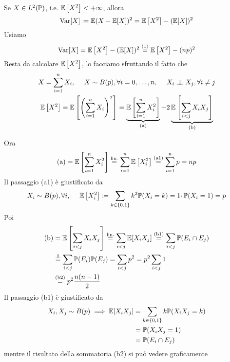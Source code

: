 \begin{enumerate}
Se $X\in L^{2}(\mathbb{P})$, i.e. $\mathbb{E}\left[X^{2}\right] < +\infty $, allora
\begin{equation*}
\mathrm{Var}[X] \coloneqq \mathbb{E}(X-\mathbb{E}[X])^{2} =\mathbb{E}\left[X^{2}\right] -(\mathbb{E}[X])^{2}
\end{equation*}
Usiamo
\begin{equation*}
\mathrm{Var}[X] =\mathbb{E}\left[X^{2}\right] -(\mathbb{E}[X])^{2}\overset{(1)}{=}\mathbb{E}\left[X^{2}\right] -(np)^{2}
\end{equation*}
Resta da calcolare $\mathbb{E}\left[X^{2}\right]$, lo facciamo sfruttando il fatto che
\begin{gather*}
X=\sum\limits_{i=1}^{n} X_{i} ,\ \ \ \ X\sim B(p) ,\forall i=0,\dots ,n,\ \ \ \ X_{i} \perp \!\!\! \perp X_{j} ,\forall i\neq j\\
\mathbb{E}\left[X^{2}\right] =\mathbb{E}\left[\left(\sum\limits_{i=1}^{n} X_{i}\right)^{2}\right] =\underbrace{\mathbb{E}\left[\sum\limits_{i=1}^{n} X_{i}^{2}\right]}_{\text{(a)}} +2\underbrace{\mathbb{E}\left[\sum\limits_{i< j} X_{i} X_{j}\right]}_{\text{(b)}}
\end{gather*}

Ora
\begin{equation*}
\text{(a)} =\mathbb{E}\left[\sum\limits_{i=1}^{n} X_{i}^{2}\right]\overset{\text{lin.}}{=}\sum\limits_{i=1}^{n}\mathbb{E}\left[X_{i}^{2}\right]\overset{\text{(a1)}}{=}\sum\limits_{i=1}^{n} p=np
\end{equation*}
Il passaggio (a1) è giustificato da
\begin{equation*}
X_{i} \sim B(p) ,\forall i,\ \ \ \ \EE\left[X_{i}^{2}\right] \coloneqq \sum\limits_{k\in \{0,1\}} k^{2}\PP(X_{i} =k) =1\cdotp \PP(X_{i} =1) =p
\end{equation*}
Poi
\begin{align*}
\text{(b)} & =\mathbb{E}\left[\sum\limits_{i< j} X_{i} X_{j}\right]\overset{\text{lin.}}{=}\sum\limits_{i< j} \mathbb{E}[X_{i} X_{j}]\overset{\text{(b1)}}{=}\sum\limits_{i< j}\mathbb{P}(E_{i} \cap E_{j})\\
 & \overset{\perp \!\!\! \perp }{=}\sum\limits_{i< j}\mathbb{P}(E_{i})\mathbb{P}(E_{j}) =\sum\limits_{i< j} p^{2} =p^{2}\sum\limits_{i< j} 1\\
 & \overset{\text{(b2)}}{=} p^{2}\frac{n(n-1)}{2}
\end{align*}
Il passaggio (b1) è giustificato da
\begin{align*}
X_{i} ,X_{j} \sim B(p) \implies \mathbb{E}[X_{i} X_{j}] & =\sum\limits_{k\in \{0,1\}} k\mathbb{P}(X_{i} X_{j} =k)\\
 & =\mathbb{P}(X_{i} X_{j} =1)\\
 & =\mathbb{P}(E_{i} \cap E_{j})
\end{align*}
mentre il risultato della sommatoria (b2) si può vedere graficamente


\end{enumerate}
